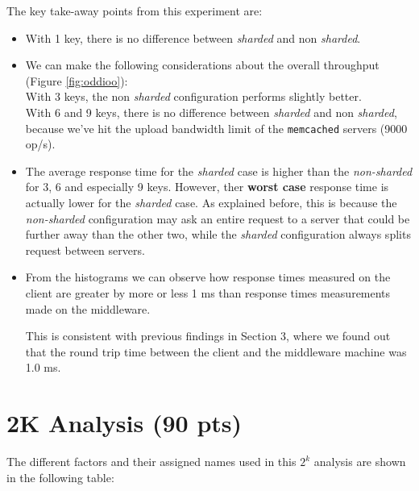 \documentclass[11pt,a4paper]{article}
\renewcommand{\t}[1]{%
	{\texttt{#1}}}
\begin{document}
The key take-away points from this experiment are:

\begin{itemize}
	\item With 1 key, there is no difference between \emph{sharded} and non \emph{sharded}.

	\item We can make the following considerations about the overall throughput
		(Figure \ref{fig:oddioo}):\\ 
		With 3 keys, the non \emph{sharded} configuration performs slightly
		better. \\ 
		With 6 and 9 keys, there is no difference between \emph{sharded} and
		non \emph{sharded}, because we've hit the upload bandwidth limit of the
		\t{memcached} servers (9000 op/s).

	\item The average response time for the \emph{sharded} case is higher than
		the \emph{non-sharded} for 3, 6 and especially 9 keys.
		However, ther \textbf{worst case} response time is actually lower
		for the \emph{sharded} case. As explained before, this is because
		the \emph{non-sharded} configuration may ask an entire request
		to a server that could be further away than the other two, while the
		\emph{sharded} configuration always splits request between servers.

	\item From the histograms we can observe how response times measured
		on the client are greater by more or less 1 ms than response times
		measurements made on the middleware.

		This is consistent with previous findings in Section 3, where we 
		found out that the round trip time between the client and the middleware
		machine was 1.0 ms.
\end{itemize}





















\section{2K Analysis (90 pts)}

The different factors and their  assigned names used in this $2^k$ analysis are shown in the following table:
\end{document}
